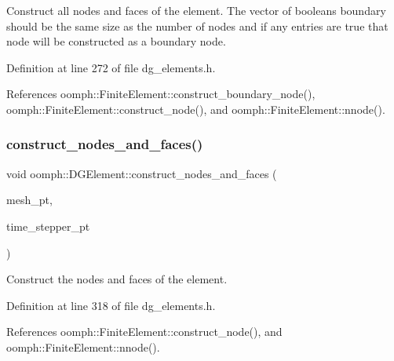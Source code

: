Construct all nodes and faces of the element. The vector of booleans boundary should be the same size as the number of nodes and if any entries are true that node will be constructed as a boundary node. 



Definition at line 272 of file dg\+\_\+elements.\+h.



References oomph\+::\+Finite\+Element\+::construct\+\_\+boundary\+\_\+node(), oomph\+::\+Finite\+Element\+::construct\+\_\+node(), and oomph\+::\+Finite\+Element\+::nnode().

\mbox{\label{classoomph_1_1DGElement_a6f7fc1def2a798ee364ae33c8925245f}} 
\subsubsection{\texorpdfstring{construct\+\_\+nodes\+\_\+and\+\_\+faces()}{construct\_nodes\_and\_faces()}}
{\footnotesize\ttfamily void oomph\+::\+D\+G\+Element\+::construct\+\_\+nodes\+\_\+and\+\_\+faces (\begin{DoxyParamCaption}\item[{\hyperlink{classoomph_1_1DGMesh}{D\+G\+Mesh} $\ast$const \&}]{mesh\+\_\+pt,  }\item[{\hyperlink{classoomph_1_1TimeStepper}{Time\+Stepper} $\ast$const \&}]{time\+\_\+stepper\+\_\+pt }\end{DoxyParamCaption})\hspace{0.3cm}{\ttfamily [inline]}}



Construct the nodes and faces of the element. 



Definition at line 318 of file dg\+\_\+elements.\+h.



References oomph\+::\+Finite\+Element\+::construct\+\_\+node(), and oomph\+::\+Finite\+Element\+::nnode().

\mbox{\label{classoomph_1_1DGElement_a1fb4172f65716e0b5277efc65b182d44}} 

